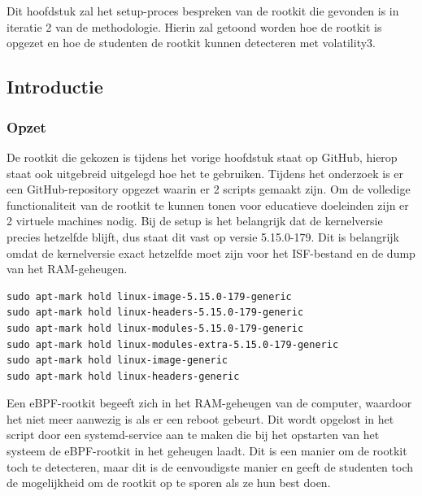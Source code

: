 \chapter{}%
\label{ch:proof-of-concept}

Dit hoofdstuk zal het setup-proces bespreken van de rootkit die gevonden is in iteratie 2 van de methodologie.
Hierin zal getoond worden hoe de rootkit is opgezet en hoe de studenten de rootkit kunnen detecteren met volatility3.

\section{Introductie}

\subsection{Opzet}
De rootkit die gekozen is tijdens het vorige hoofdstuk staat op GitHub, hierop staat ook uitgebreid uitgelegd hoe het te gebruiken.
Tijdens het onderzoek is er een GitHub-repository opgezet waarin er 2 scripts gemaakt zijn.
Om de volledige functionaliteit van de rootkit te kunnen tonen voor educatieve doeleinden zijn er 2 virtuele machines nodig.
Bij de setup is het belangrijk dat de kernelversie precies hetzelfde blijft, dus staat dit vast op versie 5.15.0-179.
Dit is belangrijk omdat de kernelversie exact hetzelfde moet zijn voor het ISF-bestand en de dump van het RAM-geheugen.

\begin{verbatim}
sudo apt-mark hold linux-image-5.15.0-179-generic
sudo apt-mark hold linux-headers-5.15.0-179-generic
sudo apt-mark hold linux-modules-5.15.0-179-generic
sudo apt-mark hold linux-modules-extra-5.15.0-179-generic
sudo apt-mark hold linux-image-generic
sudo apt-mark hold linux-headers-generic
\end{verbatim}

Een eBPF-rootkit begeeft zich in het RAM-geheugen van de computer, waardoor het niet meer aanwezig is als er een reboot gebeurt.
Dit wordt opgelost in het script door een systemd-service aan te maken die bij het opstarten van het systeem de eBPF-rootkit in het geheugen laadt.
Dit is een manier om de rootkit toch te detecteren, maar dit is de eenvoudigste manier en geeft de studenten toch de mogelijkheid om de rootkit op te sporen als ze hun best doen.

